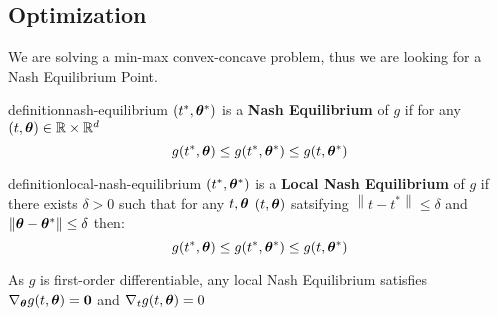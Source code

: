 \documentclass{article} %
\newcommand{\norm}[1]{\left\lVert#1\right\rVert}
\begin{document}
	\subsection{Optimization}

	We are solving a min-max convex-concave problem, thus we are looking for a Nash Equilibrium Point. 
	
	\begin{restatable}{definition}{nash-equilibrium}
		\label{def:nash-equilibrium}
		$(t^*,{\bm{\theta}}^*)$ is a \textbf{Nash Equilibrium} of $g$ if for any $(t,{\bm{\theta}}) \in \mathbb{R}\times\mathbb{R}^d$\vspace{1em}
		\begin{equation}
			g(t^*,{\bm{\theta}}) \leq g(t^*,{\bm{\theta}}^*) \leq g(t,{\bm{\theta}}^*)
		\end{equation}
	\end{restatable}	
	\begin{restatable}{definition}{local-nash-equilibrium}
		\label{def:local-nash-equilibrium}
		$(t^*,{\bm{\theta}}^*)$ is a \textbf{Local Nash Equilibrium} of $g$ if there exists $\delta > 0$ such that for any $t,{\bm{\theta}}$ $(t,{\bm{\theta}})$ satsifying $\norm{t - t^*} \leq \delta$ and $\norm{\vtheta -\vtheta^*} \leq \delta$ then: 
		\vspace{1em}
		\begin{equation}
			g(t^*,{\bm{\theta}}) \leq g(t^*,{\bm{\theta}}^*) \leq g(t,{\bm{\theta}}^*)
		\end{equation}
	\end{restatable}
	\begin{proposition}\label{prop:first-order-nash}
		As $g$ is first-order differentiable,  any local Nash Equilibrium satisfies $\nabla_{\bm{\theta}} g(t,{\bm{\theta}}) = \mathbf{0}$ and $\nabla_t g(t,{\bm{\theta}}) = 0$
	\end{proposition}
	
\end{document}
